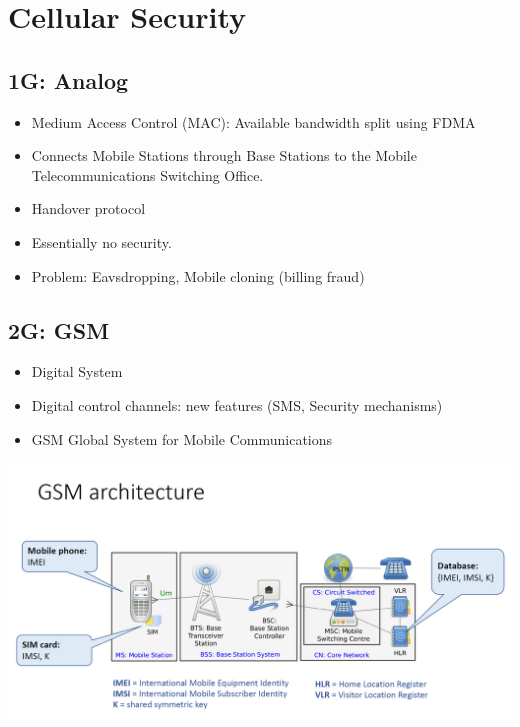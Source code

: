 \section{Cellular Security}

\subsection{1G: Analog}

\begin{itemize}
    \item Medium Access Control (MAC): Available bandwidth split using FDMA
    \item Connects Mobile Stations through Base Stations to the Mobile Telecommunications Switching Office.
    \item Handover protocol
    \item Essentially no security.
    \item Problem: Eavsdropping, Mobile cloning (billing fraud)
\end{itemize}

\subsection{2G: GSM}

\begin{itemize}
    \item Digital System
    \item Digital control channels: new features (SMS, Security mechanisms)
    \item GSM Global System for Mobile Communications
\end{itemize}

\begin{minipage}{\linewidth}
    \centering      
    \includegraphics[width=\linewidth]{Figures/L10_gsm.PNG}
\end{minipage}

